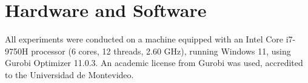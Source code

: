 \section{Hardware and Software}


All experiments were conducted on a machine equipped with an Intel Core i7-9750H processor (6 cores, 12 threads, 2.60 GHz), running Windows 11, using Gurobi Optimizer 11.0.3. An academic license from Gurobi was used, accredited to the Universidad de Montevideo.
